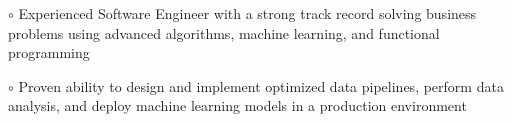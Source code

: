 \documentclass[10pt,a4paper]{moderncv}
\begin{document}
\maketitle

\vspace{15pt}

$\circ$ Experienced Software Engineer with a strong track record solving business problems using advanced algorithms, machine learning, and functional programming

\vspace{2pt}

$\circ$ Proven ability to design and implement optimized data pipelines, perform data analysis, and deploy machine learning models in a production environment

\vspace{25pt}
\end{document}
